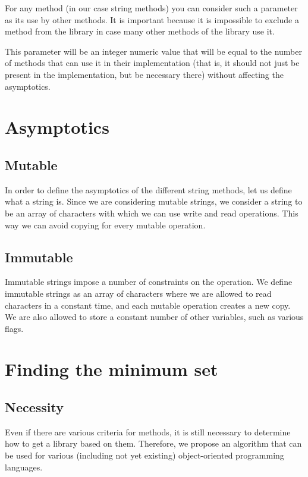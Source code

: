 \documentclass[anonymous,sigplan,review,11pt,nonacm,natbib=false]{acmart}
\begin{document}
    For any method (in our case string methods) you can consider such a parameter as its use by other methods. It is important because it is impossible to exclude a method from the library in case many other methods of the library use it.

    This parameter will be an integer numeric value that will be equal to the number of methods that can use it in their implementation (that is, it should not just be present in the implementation, but be necessary there) without affecting the asymptotics.

    \section{Asymptotics}

    \subsection{Mutable}

    In order to define the asymptotics of the different string methods, let us define what a string is. Since we are considering mutable strings, we consider a string to be an array of characters with which we can use write and read operations. This way we can avoid copying for every mutable operation.

    \subsection{Immutable}

    Immutable strings impose a number of constraints on the operation. We define immutable strings as an array of characters where we are allowed to read characters in a constant time, and each mutable operation creates a new copy. We are also allowed to store a constant number of other variables, such as various flags.

    \section{Finding the minimum set}

    \subsection{Necessity}

    Even if there are various criteria for methods, it is still necessary to determine how to get a library based on them. Therefore, we propose an algorithm that can be used for various (including not yet existing) object-oriented programming languages.
\end{document}
